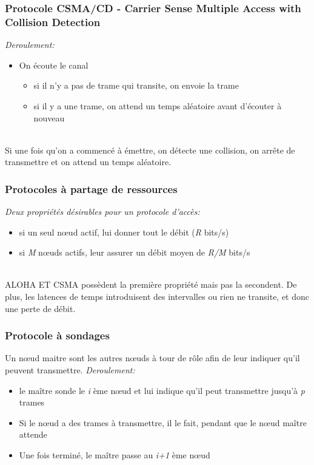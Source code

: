 \documentclass[a4paper, 12pt, french]{article}
\begin{document}
	\subsubsection{Protocole CSMA/CD - Carrier Sense Multiple Access with Collision Detection}

	\emph{Deroulement:}
	\begin{itemize}
		\item On écoute le canal
		\begin{itemize}
			\item si il n'y a pas de trame qui transite, on envoie la trame
			\item si il y a une trame, on attend un temps aléatoire avant d'écouter à nouveau
		\end{itemize}
	\end{itemize}\mbox{}\\

	Si une fois qu'on a commencé à émettre, on détecte une collision, on arrête de transmettre et on attend un temps aléatoire.

	\subsubsection{Protocoles à partage de ressources}

	\emph{Deux propriétés désirables pour un protocole d'accès:}
	\begin{itemize}
		\item si un seul nœud actif, lui donner tout le débit (\emph{R} bits/s)
		\item si \emph{M} nœuds actifs, leur assurer un débit moyen de \emph{R/M} bits/s
	\end{itemize}\mbox{}\\

	ALOHA ET CSMA possèdent la première propriété mais pas la secondent. De plus, les latences de temps introduisent des intervalles ou rien ne transite, et donc une perte de débit.

	\subsubsection{Protocole à sondages}

	Un nœud maitre sont les autres nœuds à tour de rôle afin de leur indiquer qu'il peuvent transmettre.
	\emph{Deroulement:}
	\begin{itemize}
		\item le maître sonde le \emph{i} ème nœud et lui indique qu'il peut transmettre jusqu'à \emph{p} trames
		\item Si le nœud a des trames à transmettre, il le fait, pendant que le nœud maître attende
		\item Une fois terminé, le maître passe au \emph{i+1} ème nœud
	\end{itemize}\mbox{}\\
\end{document}
